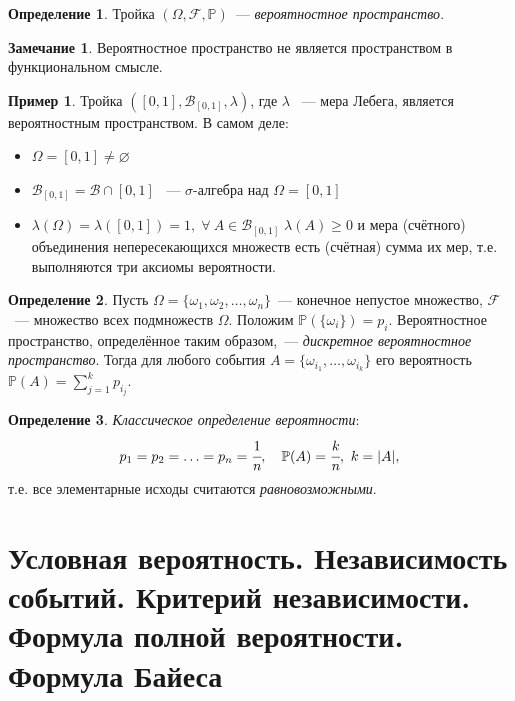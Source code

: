 \documentclass[oneside,final,14pt]{extreport}
\newcommand\myprob[1]{{\mathbb{P}(#1)}}
\theoremstyle{plain}
\theoremstyle{definition}
\newtheorem*{defn}{Определение}
\newtheorem*{exmp}{Пример}
\newtheorem*{rmrk}{Замечание}
\theoremstyle{named}
\begin{document}
\pagebreak

\begin{defn}
    Тройка $(\Omega, \mathcal{F}, \mathbb{P})$~--- {\it вероятностное пространство}.
\end{defn}
\begin{rmrk}
    Вероятностное пространство не является пространством в функциональном смысле.
\end{rmrk}

\begin{exmp}
    Тройка $\left( [0, 1], \mathcal{B}_{[0, 1]}, \lambda \right)$, где $\lambda$ ~--- мера Лебега, является вероятностным пространством. В самом деле:
    \begin{itemize}
    \item $\Omega = [0, 1] \neq \varnothing$
    \item $\mathcal{B}_{[0,1]} = \mathcal{B} \cap [0, 1] $ ~--- $\sigma$-алгебра над $\Omega = [0, 1]$ 
    \item $\lambda(\Omega) = \lambda([0, 1]) = 1, \; \forall \: A \in \mathcal{B}_{[0, 1]} \; \lambda(A) \geqslant 0$ и мера (счётного) объединения непересекающихся множеств есть (счётная) сумма их мер, т.е. выполняются три аксиомы вероятности.
    \end{itemize}
\end{exmp}

\begin{defn}
    Пусть $\Omega = \{\omega_1, \omega_2, \ldots, \omega_n\}$~--- конечное непустое множество, $\mathcal{F}$~--- множество всех подмножеств $\Omega$. Положим $\myprob{\{\omega_i\}} = p_i$. Вероятностное пространство, определённое таким образом,~--- {\it дискретное вероятностное пространство}. Тогда для любого события $A = \{\omega_{i_1}, \ldots, \omega_{i_k}\}$ его вероятность $\myprob{A} = \sum\limits_{j=1}^k p_{i_j}$.
\end{defn}

\begin{defn}
    {\it Классическое определение вероятности}:
    \begin{equation*}
        p_1 = p_2 = \ldots =p_n=\cfrac{1}{n}, \quad \myprob{A} = \cfrac{k}{n},~ k=|A|,
    \end{equation*}
    т.е. все элементарные исходы считаются {\it равновозможными}.
\end{defn}

\section {Условная вероятность. Независимость событий. Критерий независимости. Формула полной вероятности. Формула Байеса}
\end{document}
